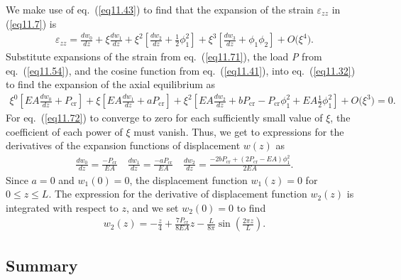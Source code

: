 \documentclass{AeroStructure-ERJohnson}
\begin{document}
We make use of eq.~(\ref{eq11.43}) to find that the expansion of the strain $\varepsilon_{z z}$ in (\ref{eq11.7}) is
\begin{align}\label{eq11.71}
\varepsilon_{z z}=\frac{d w_{0}}{d z}+\xi \frac{d w_{1}}{d z}+\xi^{2}\left[\frac{d w_{2}}{d z}+\frac{1}{2} \phi_{1}^{2}\right]+\xi^{3}\left[\frac{d w_{3}}{d z}+\phi_{1} \phi_{2}\right]+O\big(\xi^{4}\big).
\end{align}
Substitute expansions of the strain from eq.~(\ref{eq11.71}), the load \textit{P} from eq.~(\ref{eq11.54}), and the cosine function from eq.~(\ref{eq11.41}), into eq.~(\ref{eq11.32}) to find the expansion of the axial equilibrium as
\begin{align}\label{eq11.72}
\xi^{0}\left[E A \frac{d w_{0}}{d z}+P_{\mathrm{cr}}\right]+\xi\left[E A \frac{d w_{1}}{d z}+a P_{\mathrm{cr}}\right]+\xi^{2}\left[E A \frac{d w_{2}}{d z}+b P_{\mathrm{cr}}-P_{\mathrm{cr}} \phi_{1}^{2}+E A \frac{1}{2} \phi_{1}^{2}\right]+O\big(\xi^{3}\big)=0.
\end{align}
For eq.~(\ref{eq11.72}) to converge to zero for each sufficiently small value of $\xi$, the coefficient of each power of $\xi$ must vanish. Thus, we get to expressions for the derivatives of the expansion functions of displacement $w(z)$ as
\begin{align}\label{eq11.73}
\frac{d w_{0}}{d z}=\frac{-P_{\mathrm{cr}}}{E A} \quad \frac{d w_{1}}{d z}=\frac{-a P_{\mathrm{cr}}}{E A} \quad \frac{d w_{2}}{d z}=\frac{-2 b P_{\mathrm{cr}}+\left(2 P_{\mathrm{cr}}-E A\right) \phi_{1}^{2}}{2 E A}.
\end{align}
Since $a=0$ and $w_{1}(0)=0$, the displacement function $w_{1}(z)=0$ for $0 \leq z \leq L$. The expression for the derivative of displacement function $w_{2}(z)$ is integrated with respect to $z$, and we set $w_{2}(0)=0$ to find
\begin{align}\label{eq11.74}
w_{2}(z)=-\frac{z}{4}+\frac{7 P_{\mathrm{cr}}}{8 E A} z-\frac{L}{8 \pi} \sin \left(\frac{2 \pi z}{L}\right).
\end{align}
\vspace*{2pt}
\pagebreak

\subsection{Summary}\label{sec11.2.7}
\end{document}
